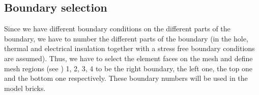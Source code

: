\documentclass[a4paper,11pt,english]{sphinxmanual}
\begin{document}
\clearpage


\subsection{Boundary selection}
\label{\detokenize{tutorial/thermo_coupling:boundary-selection}}
Since we have different boundary conditions on the different parts of the boundary, we have to number the different parts of the boundary (in the hole, thermal and electrical insulation together with a stress free boundary conditions are assumed). Thus, we have to select the element faces on the mesh and define mesh regions (see ) 1, 2, 3, 4 to be the right boundary, the left one, the top one and the bottom one respectively. These boundary numbers will be used in the model bricks.
\end{document}

